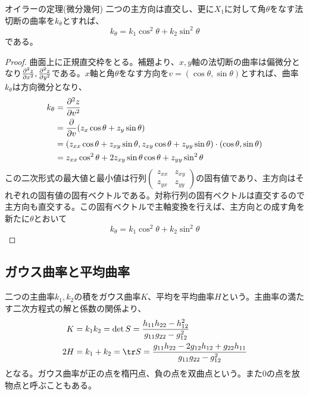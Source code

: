         \begin{thm}{オイラーの定理(微分幾何)}
            二つの主方向は直交し、更に$X_1$に対して角$\theta$をなす法切断の曲率を$k_\theta$とすれば、
                \[k_\theta = k_1\cos^2\theta + k_2\sin^2\theta\]
            である。
        \end{thm}
        \begin{proof}
            曲面上に正規直交枠をとる。補題より、$x,y$軸の法切断の曲率は偏微分となり$\pd[^2z]{x^2},\pd[^2z]{y^2}$である。$x$軸と角$\theta$をなす方向を$v = (\cos\theta, \sin\theta)$とすれば、曲率$k_\theta$は方向微分となり、
            \begin{align*}
                k_\theta &= \pd[^2z]{v^2}\\
                &= \pd{v}(z_x\cos\theta + z_y\sin\theta)\\
                &= (z_{xx}\cos\theta + z_{xy}\sin\theta, z_{xy}\cos\theta + z_{yy}\sin\theta) \cdot (\cos\theta, \sin\theta)\\
                &= z_{xx}\cos^2\theta + 2z_{xy}\sin\theta\cos\theta + z_{yy}\sin^2\theta
            \end{align*}
            この二次形式の最大値と最小値は行列$\begin{pmatrix}z_{xx} & z_{xy}\\ z_{yx} & z_{yy}\end{pmatrix}$の固有値であり、主方向はそれぞれの固有値の固有ベクトルである。対称行列の固有ベクトルは直交するので主方向も直交する。この固有ベクトルで主軸変換を行えば、主方向との成す角を新たに$\theta$とおいて
                \[k_\theta = k_1\cos^2\theta + k_2\sin^2\theta\]
        \end{proof}

    \subsection{ガウス曲率と平均曲率}
        二つの主曲率$k_1,k_2$の積をガウス曲率$K$、平均を平均曲率$H$という。主曲率の満たす二次方程式の解と係数の関係より、
        \begin{align*}
            K &= k_1k_2 = \det S = \frac{h_{11}h_{22} - h_{12}^2}{g_{11}g_{22} - g_{12}^2}\\
            2H &= k_1 + k_2 = \tr S = \frac{g_{11}h_{22} - 2g_{12}h_{12} + g_{22}h_{11}}{g_{11}g_{22} - g_{12}^2}\\
        \end{align*}
        となる。ガウス曲率が正の点を楕円点、負の点を双曲点という。また0の点を放物点と呼ぶこともある。